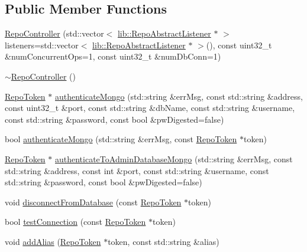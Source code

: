 \subsection*{Public Member Functions}
\begin{DoxyCompactItemize}
\item 
\hyperlink{classrepo_1_1_repo_controller_ac96f092e2b21994a9db27413cc8c9b51}{Repo\+Controller} (std\+::vector$<$ \hyperlink{classrepo_1_1lib_1_1_repo_abstract_listener}{lib\+::\+Repo\+Abstract\+Listener} $\ast$ $>$ listeners=std\+::vector$<$ \hyperlink{classrepo_1_1lib_1_1_repo_abstract_listener}{lib\+::\+Repo\+Abstract\+Listener} $\ast$ $>$(), const uint32\+\_\+t \&num\+Concurrent\+Ops=1, const uint32\+\_\+t \&num\+Db\+Conn=1)
\item 
\hyperlink{classrepo_1_1_repo_controller_af52fa35d9aad20664dbfaf4bb486c4b6}{$\sim$\+Repo\+Controller} ()
\item 
\hyperlink{class_repo_controller_1_1_repo_token}{Repo\+Token} $\ast$ \hyperlink{classrepo_1_1_repo_controller_a03c71e975ffd4db50990e2eccb3eb744}{authenticate\+Mongo} (std\+::string \&err\+Msg, const std\+::string \&address, const uint32\+\_\+t \&port, const std\+::string \&db\+Name, const std\+::string \&username, const std\+::string \&password, const bool \&pw\+Digested=false)
\item 
bool \hyperlink{classrepo_1_1_repo_controller_a9793026eb711325e6b3ad0a0b0dab87b}{authenticate\+Mongo} (std\+::string \&err\+Msg, const \hyperlink{class_repo_controller_1_1_repo_token}{Repo\+Token} $\ast$token)
\item 
\hyperlink{class_repo_controller_1_1_repo_token}{Repo\+Token} $\ast$ \hyperlink{classrepo_1_1_repo_controller_a10507817e0772688ee2e9db6814bfa38}{authenticate\+To\+Admin\+Database\+Mongo} (std\+::string \&err\+Msg, const std\+::string \&address, const int \&port, const std\+::string \&username, const std\+::string \&password, const bool \&pw\+Digested=false)
\item 
void \hyperlink{classrepo_1_1_repo_controller_a87b3a047d3c03d10a8d1ec9c82edd0f0}{disconnect\+From\+Database} (const \hyperlink{class_repo_controller_1_1_repo_token}{Repo\+Token} $\ast$token)
\item 
bool \hyperlink{classrepo_1_1_repo_controller_ab15351dab4cf38f830f28f160bc7af7c}{test\+Connection} (const \hyperlink{class_repo_controller_1_1_repo_token}{Repo\+Token} $\ast$token)
\item 
void \hyperlink{classrepo_1_1_repo_controller_aacab4822c583a582081abb3c0e0b8e3b}{add\+Alias} (\hyperlink{class_repo_controller_1_1_repo_token}{Repo\+Token} $\ast$token, const std\+::string \&alias)

\end{DoxyCompactItemize}
